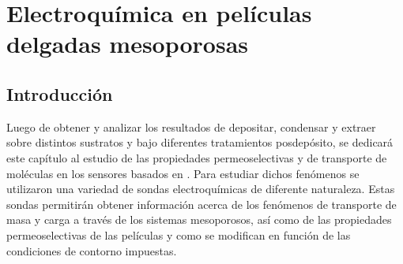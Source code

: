  \newcommand{\NoBiblioEQ}[1]{
 \ifthenelse{\equal{#1}{verdadero}}{}{}
 \NoBiblioEQ{verdadero}}


 \FormatoCapituloDosLineas
 
 \chapter{Electroquímica en películas delgadas mesoporosas}
 \label{chap:Electroquimica}

 \thispagestyle{empty}
	

 \vfill
 \minitoc
 \newpage

\section{Introducción}

	Luego de obtener y analizar los resultados de depositar, condensar y extraer \pdm\space sobre distintos sustratos y bajo diferentes tratamientos posdepósito, se dedicará este capítulo al estudio de las propiedades permeoselectivas y de transporte de moléculas en los sensores basados en \pdm. Para estudiar dichos fenómenos se utilizaron una variedad de sondas electroquímicas de diferente naturaleza. Estas sondas permitirán obtener información acerca de los fenómenos de transporte de masa y carga a través de los sistemas mesoporosos, así como de las propiedades permeoselectivas de las películas y como se modifican en función de las condiciones de contorno impuestas. 

